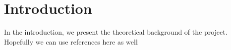 \section*{Introduction}

In the introduction, we present the theoretical background of the project. Hopefully we can use references here as well \cite{rokem2015}
